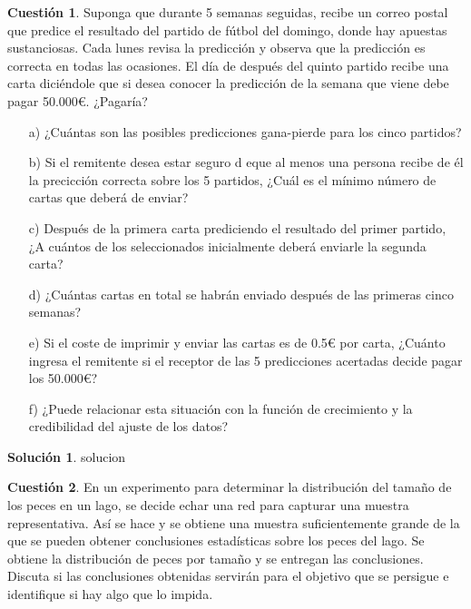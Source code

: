 \documentclass[a4paper, 11pt]{article}
\theoremstyle{definition}
\newtheorem{cuestion}{Cuestión}
\newtheorem*{solucion}{Solución}
\begin{document}
  \begin{cuestion}
    Suponga que durante 5 semanas seguidas, recibe un correo postal que predice el resultado del partido de fútbol del domingo, donde hay apuestas sustanciosas. Cada lunes revisa la predicción y observa que la predicción es correcta en todas las ocasiones. El día de después del quinto partido recibe una carta diciéndole que si desea conocer la predicción de la semana que viene debe pagar 50.000\euro{}. ¿Pagaría?

    \begin{enumerate}
      \item[a)] ¿Cuántas son las posibles predicciones gana-pierde para los cinco partidos?
      \item[b)] Si el remitente desea estar seguro d eque al menos una persona recibe de él la precicción correcta sobre los 5 partidos, ¿Cuál es el mínimo número de cartas que deberá de enviar?
      \item[c)] Después de la primera carta prediciendo el resultado del primer partido, ¿A cuántos de los seleccionados inicialmente deberá enviarle la segunda carta?
      \item[d)] ¿Cuántas cartas en total se habrán enviado después de las primeras cinco semanas?
      \item[e)] Si el coste de imprimir y enviar las cartas es de 0.5€ por carta, ¿Cuánto ingresa el remitente si el receptor de las 5 predicciones acertadas decide pagar los 50.000\euro{}?
      \item[f)] ¿Puede relacionar esta situación con la función de crecimiento y la credibilidad del ajuste de los datos?
    \end{enumerate}
  \end{cuestion}

  \begin{solucion}
    solucion
  \end{solucion}

  \begin{cuestion}
    En un experimento para determinar la distribución del tamaño de los peces en un lago, se decide echar una red para capturar una muestra representativa. Así se hace y se obtiene una muestra suficientemente grande de la que se pueden obtener conclusiones estadísticas sobre los peces del lago. Se obtiene la distribución de peces por tamaño y se entregan las conclusiones. Discuta si las conclusiones obtenidas servirán para el objetivo que se persigue e identifique si hay algo que lo impida.
  \end{cuestion}
\end{document}

